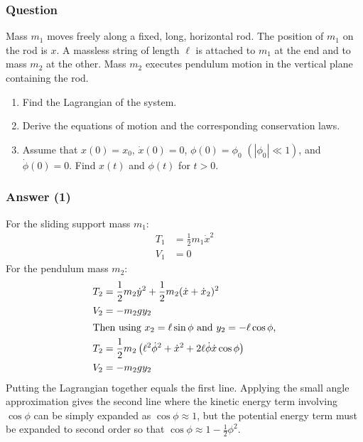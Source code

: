 \subsubsection{Question}

Mass $m_1$ moves freely along a fixed, long, horizontal rod. The position of
$m_1$ on the rod is $x$. A massless string of length $\ell $ is attached to $m_1$
at the end and to mass $m_2$ at the other. Mass $m_2$ executes pendulum motion
in the vertical plane containing the rod.
\begin{enumerate}
	\item
		Find the Lagrangian of the system.
	\item
		Derive the equations of motion and the corresponding conservation laws.
	\item
		Assume that $x(0)=x_0$, $\dot x(0)=0$, $\phi (0)=\phi_0$ $(|\phi_0| {\ll} 1)$,
		and $\dot \phi (0)=0$. Find $x(t)$ and $\phi (t)$ for $t > 0$.
\end{enumerate}


\subsubsection{Answer (1)}
For the sliding support mass $m_1$:
\begin{align*}
	T_1 &= \frac{1}{2}m_1 \dot{x}^2 \\
	V_1 &= 0
\end{align*}
For the pendulum mass $m_2$:
\begin{align*}
	T_2 &= \frac{1}{2}m_2 \dot{y}^2 + \frac{1}{2}m_2(\dot x + \dot x_2)^2 \\
	V_2 &= -m_2gy_2 \\
\intertext{Then using $x_2 = \ell \sin \phi $ and $y_2 = -\ell \cos \phi $,}
	T_2 &= \frac{1}{2}m_2 \left( \ell ^2\dot \phi ^2 + \dot x^2 + 2\ell \dot \phi \dot x \cos \phi 
		\right) \\
	V_2 &= -m_2 g y_2
\end{align*}
Putting the Lagrangian together equals the first line. Applying the small
angle approximation gives the second line where the kinetic energy term
involving $\cos \phi $ can be simply expanded as $\cos \phi  \approx 1$, but the potential
energy term must be expanded to second order so that $\cos \phi  \approx 1 -
\frac{1}{2}\phi ^2$.

